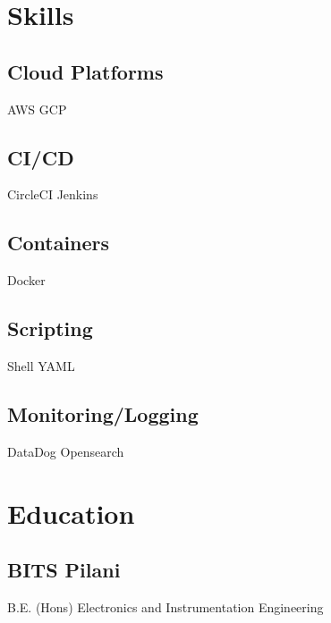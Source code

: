 \documentclass[]{plushcv}
\begin{document}
\begin{minipage}[t]{0.2\textwidth} 

\vspace{-0.375cm}
\section{Skills}
\vspace{-0.375cm}
\subsection{Cloud Platforms}
\textbullet{} AWS  \textbullet{} GCP 
\subsection{CI/CD} 
\textbullet{} CircleCI \textbullet{} Jenkins
\subsection{Containers} 
\textbullet{} Docker
\subsection{Scripting} 
\textbullet{} Shell \textbullet{} YAML
\subsection{Monitoring/Logging}
\textbullet{} DataDog \textbullet{} Opensearch

\section{Education}
\vspace{-0.375cm}
\subsection{BITS Pilani}
B.E. (Hons) Electronics and Instrumentation \newline Engineering \\



\end{minipage}
\end{document}
